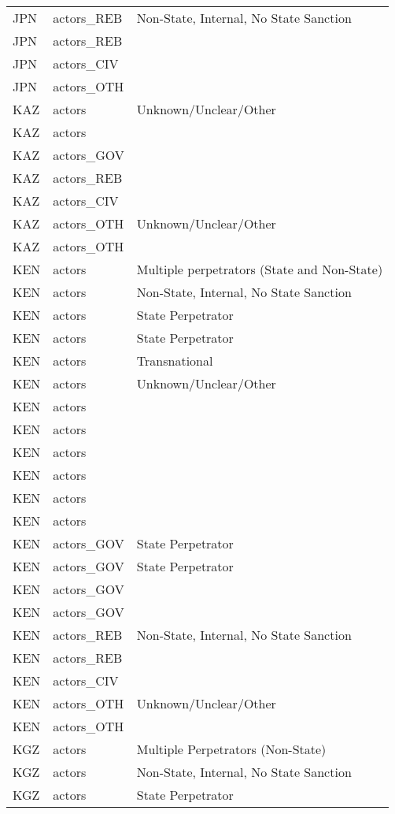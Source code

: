 \begin{table}[ht]
\begin{tabular}{lll}
  JPN & actors\_REB & Non-State, Internal, No State Sanction \\ 
  JPN & actors\_REB &  \\ 
  JPN & actors\_CIV &  \\ 
  JPN & actors\_OTH &  \\ 
  KAZ & actors & Unknown/Unclear/Other \\ 
  KAZ & actors &  \\ 
  KAZ & actors\_GOV &  \\ 
  KAZ & actors\_REB &  \\ 
  KAZ & actors\_CIV &  \\ 
  KAZ & actors\_OTH & Unknown/Unclear/Other \\ 
  KAZ & actors\_OTH &  \\ 
  KEN & actors & Multiple perpetrators (State and Non-State) \\ 
  KEN & actors & Non-State, Internal, No State Sanction \\ 
  KEN & actors & State Perpetrator \\ 
  KEN & actors & State Perpetrator \\ 
  KEN & actors & Transnational \\ 
  KEN & actors & Unknown/Unclear/Other \\ 
  KEN & actors &  \\ 
  KEN & actors &  \\ 
  KEN & actors &  \\ 
  KEN & actors &  \\ 
  KEN & actors &  \\ 
  KEN & actors &  \\ 
  KEN & actors\_GOV & State Perpetrator \\ 
  KEN & actors\_GOV & State Perpetrator \\ 
  KEN & actors\_GOV &  \\ 
  KEN & actors\_GOV &  \\ 
  KEN & actors\_REB & Non-State, Internal, No State Sanction \\ 
  KEN & actors\_REB &  \\ 
  KEN & actors\_CIV &  \\ 
  KEN & actors\_OTH & Unknown/Unclear/Other \\ 
  KEN & actors\_OTH &  \\ 
  KGZ & actors & Multiple Perpetrators (Non-State) \\ 
  KGZ & actors & Non-State, Internal, No State Sanction \\ 
  KGZ & actors & State Perpetrator \\ 

\end{tabular}
\end{table}
